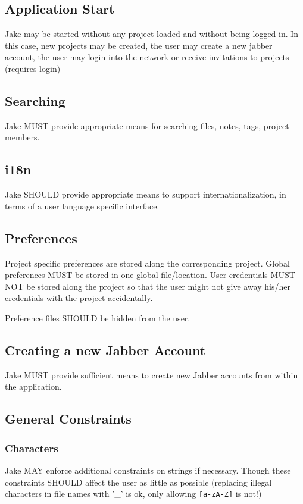 \subsection{Application Start}
Jake may be started without any project loaded and without being logged in. In this case, new projects may be created, the user may create a new jabber account, the user may login into the network or receive invitations to projects (requires login)

\subsection{Searching}
Jake MUST provide appropriate means for searching files, notes, tags, project members.

\subsection{i18n}
Jake SHOULD provide appropriate means to support internationalization, in terms of a user language specific interface.

\subsection{Preferences}
Project specific preferences are stored along the corresponding project. Global preferences MUST be stored in one global file/location. User credentials MUST NOT be stored along the project so that the user might not give away his/her credentials with the project accidentally.

Preference files SHOULD be hidden from the user.

\subsection{Creating a new Jabber Account}
Jake MUST provide sufficient means to create new Jabber accounts from within the application.

\subsection{General Constraints}
\subsubsection{Characters}
Jake MAY enforce additional constraints on strings if necessary. Though these constraints SHOULD affect the user as little as possible (replacing illegal characters in file names with '\_' is ok, only allowing \texttt{[a-zA-Z]} is not!)

